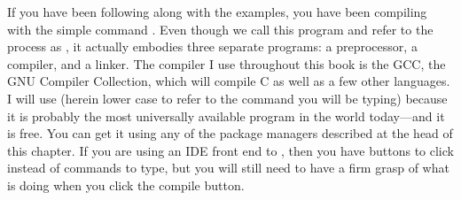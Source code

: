 If you have been following along with the examples, you have been
compiling with the simple command . 
Even though we call this program  and refer to the
process as , it actually
embodies three separate programs: a
preprocessor, a compiler, and a linker. The compiler I use
throughout this book is the GCC, the GNU Compiler Collection, which will
compile C as well as a few other languages. I will use  (herein
lower case to refer to the command you will be typing) because it is probably
the most universally available program in the world today---and it is free.
You can get it using any of the package managers described at the head
of this chapter. If you are using an IDE front end to ,
then you have buttons to click instead of commands to type, but you will
still need to have a firm grasp of what  is doing when you
click the compile button.

